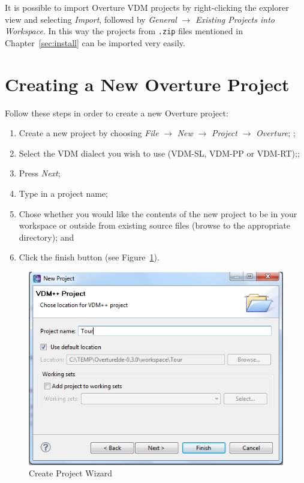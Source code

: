 \documentclass{overturerepchap}
\begin{document}
It is possible to import Overture VDM projects by
right-clicking the explorer view and selecting \emph{Import}, followed
by \emph{General} $\rightarrow$ \emph{Existing Projects into
  Workspace}.  In this way the projects from \texttt{.zip} files
mentioned in Chapter~\ref{sec:install} can be imported very
easily.  

\section{Creating a New Overture Project}

Follow these steps in order to create a new Overture project:

\begin{enumerate}
	\item Create a new project by choosing \emph{File}
          $\rightarrow$ \emph{New} $\rightarrow$ \emph{Project}
          $\rightarrow$ \emph{Overture}; ;
	\item Select the VDM dialect you wish to use (VDM-SL, VDM-PP
          or VDM-RT);;
	\item Press \emph{Next};
         \item Type in a project name;
	\item Chose whether you would like the contents of the new
          project to be in your workspace or outside from existing
          source files (browse to the appropriate directory); and
         \item Click
	the finish button (see Figure~\ref{fig:CreateProjectWizard}).
\end{enumerate}

\begin{figure}[!htb]
	\begin{center}
	  \includegraphics[scale=0.8]{figures/CreateProjectWizard}
	  \caption[Create Project Wizard]{Create Project Wizard}
	  \label{fig:CreateProjectWizard}
	\end{center}
\end{figure}
\end{document}
